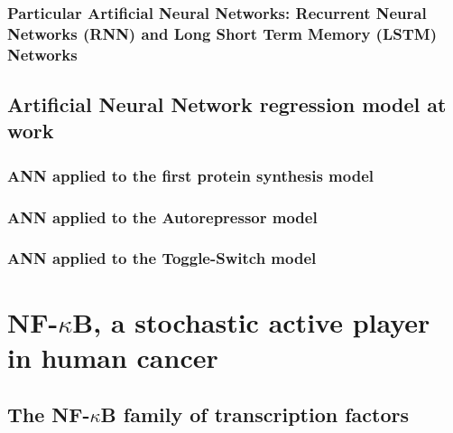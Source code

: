 \documentclass[12pt,a4paper]{report}
\begin{document}
\section{Particular Artificial Neural Networks: Recurrent Neural Networks (RNN) and Long Short Term Memory (LSTM) Networks}

\chapter{Artificial Neural Network regression model at work}
\section{ANN applied to the first protein synthesis model}
\section{ANN applied to the Autorepressor model}
\section{ANN applied to the Toggle-Switch model}

\part{NF-\texorpdfstring{$\kappa$}{}B, a stochastic active player in human cancer}
\chapter{The NF-\texorpdfstring{$\kappa$}{}B family of transcription factors}


\end{document}

